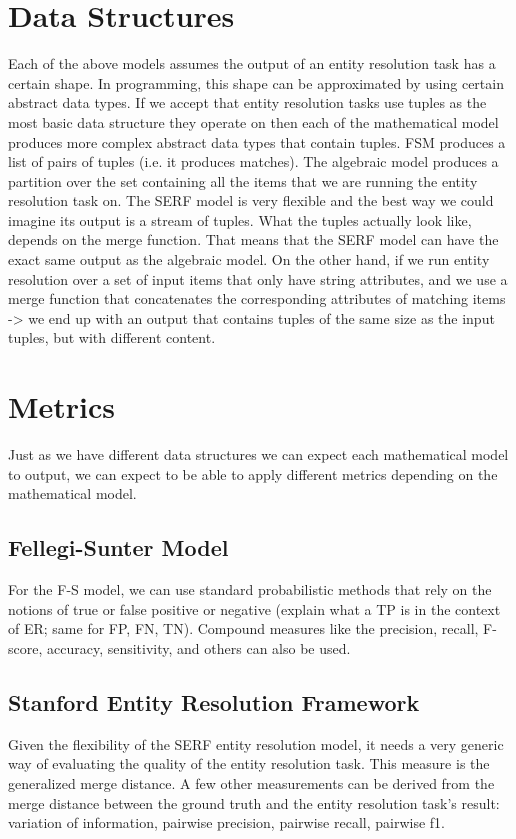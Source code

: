 \documentclass[11pt]{article}
\begin{document}
    \section{Data Structures}
    Each of the above models assumes the output of an entity resolution task has a certain shape.
    In programming, this shape can be approximated by using certain abstract data types.
    If we accept that entity resolution tasks use tuples as the most basic data structure they operate on then each of
    the mathematical model produces more complex abstract data types that contain tuples.
    FSM produces a list of pairs of tuples (i.e. it produces matches).
    The algebraic model produces a partition over the set containing all the items that we are running the
    entity resolution task on.
    The SERF model is very flexible and the best way we could imagine its output is a stream of tuples.
    What the tuples actually look like, depends on the merge function.
    That means that the SERF model can have the exact same output as the algebraic model.
    On the other hand, if we run entity resolution over a set of input items that only have string attributes, and we
    use a merge function that concatenates the corresponding attributes of matching items -> we end up with an output that contains tuples of
    the same size as the input tuples, but with different content.

    \section{Metrics}\label{sec:metrics}
    Just as we have different data structures we can expect each mathematical model to output, we can expect to be able
    to apply different metrics depending on the mathematical model.

    \subsection[fsm]{Fellegi-Sunter Model}\label{subsec:fellegi-sunter-model}
    For the F-S model, we can use standard probabilistic methods that rely on the notions of true or false positive or
    negative (explain what a TP is in the context of ER; same for FP, FN, TN).
    Compound measures like the precision, recall, F-score, accuracy, sensitivity, and others can also be used.

    \subsection[serf]{Stanford Entity Resolution Framework}\label{subsec:stanford-entity-resolution-framework}
    Given the flexibility of the SERF entity resolution model, it needs a very generic way of evaluating the quality of
    the entity resolution task.
    This measure is the generalized merge distance.
    A few other measurements can be derived from the merge distance between the ground truth and the entity resolution
    task's result: variation of information, pairwise precision, pairwise recall, pairwise f1.
\end{document}
